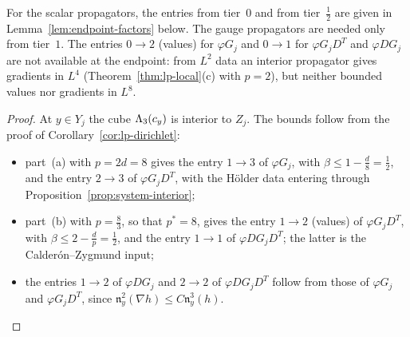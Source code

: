 For the scalar propagators, the entries from tier~$0$ and from tier~$\frac12$ are given in Lemma~\ref{lem:endpoint-factors} below. The gauge propagators are needed only from tier~$1$. The entries $0\to2$ (values) for $\varphi G_j$ and $0\to1$ for $\varphi G_jD^T$ and $\varphi DG_j$ are not available at the endpoint: from $L^2$ data an interior propagator gives gradients in $L^4$ (Theorem~\ref{thm:lp-local}(c) with $p=2$), but neither bounded values nor gradients in $L^8$.

\begin{proof}
At $y\in Y_j$ the cube $\Lambda_3(c_y)$ is interior to $Z_j$. The bounds follow from the proof of Corollary~\ref{cor:lp-dirichlet}:
\begin{itemize}
\item part~(a) with $p=2d=8$ gives the entry $1\to3$ of $\varphi G_j$, with $\beta\le1-\frac d8=\frac12$, and the entry $2\to3$ of $\varphi G_jD^T$, with the H\"older data entering through Proposition~\ref{prop:system-interior};
\item part~(b) with $p=\frac83$, so that $p^*=8$, gives the entry $1\to2$ (values) of $\varphi G_jD^T$, with $\beta\le2-\frac dp=\frac12$, and the entry $1\to1$ of $\varphi DG_jD^T$; the latter is the Calder\'on--Zygmund input;
\item the entries $1\to2$ of $\varphi DG_j$ and $2\to2$ of $\varphi DG_jD^T$ follow from those of $\varphi G_j$ and $\varphi G_jD^T$, since $\mathfrak n^2_y(\nabla h)\le C\mathfrak n^3_y(h)$.
\end{itemize}

\end{proof}
